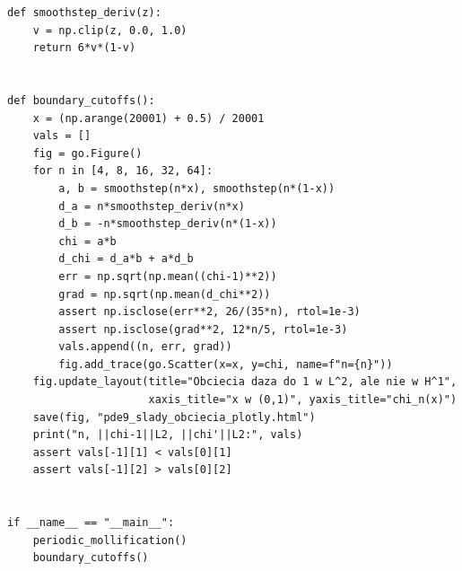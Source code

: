 \begin{lstlisting}[style=pythonpde,caption={Wygładzanie w $H^1$, pochodna słaba i obcięcia brzegowe -- Plotly},label={code:pde-sobolev9}]
def smoothstep_deriv(z):
    v = np.clip(z, 0.0, 1.0)
    return 6*v*(1-v)


def boundary_cutoffs():
    x = (np.arange(20001) + 0.5) / 20001
    vals = []
    fig = go.Figure()
    for n in [4, 8, 16, 32, 64]:
        a, b = smoothstep(n*x), smoothstep(n*(1-x))
        d_a = n*smoothstep_deriv(n*x)
        d_b = -n*smoothstep_deriv(n*(1-x))
        chi = a*b
        d_chi = d_a*b + a*d_b
        err = np.sqrt(np.mean((chi-1)**2))
        grad = np.sqrt(np.mean(d_chi**2))
        assert np.isclose(err**2, 26/(35*n), rtol=1e-3)
        assert np.isclose(grad**2, 12*n/5, rtol=1e-3)
        vals.append((n, err, grad))
        fig.add_trace(go.Scatter(x=x, y=chi, name=f"n={n}"))
    fig.update_layout(title="Obciecia daza do 1 w L^2, ale nie w H^1",
                      xaxis_title="x w (0,1)", yaxis_title="chi_n(x)")
    save(fig, "pde9_slady_obciecia_plotly.html")
    print("n, ||chi-1||L2, ||chi'||L2:", vals)
    assert vals[-1][1] < vals[0][1]
    assert vals[-1][2] > vals[0][2]


if __name__ == "__main__":
    periodic_mollification()
    boundary_cutoffs()
\end{lstlisting}


